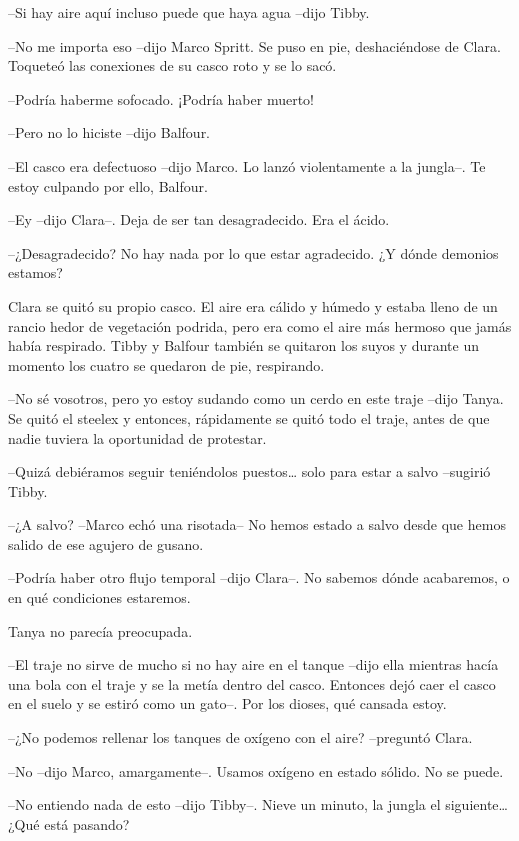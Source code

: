 {--Si hay aire aquí incluso puede que haya agua --dijo Tibby.}

{--No me importa eso --dijo Marco Spritt. Se puso en pie, deshaciéndose
de Clara. Toqueteó las conexiones de su casco roto y se lo sacó.}

{--Podría haberme sofocado. ¡Podría haber muerto!}

{--Pero no lo hiciste --dijo Balfour.}

{--El casco era defectuoso --dijo Marco. Lo lanzó violentamente a la
jungla--. Te estoy culpando por ello, Balfour.}

{--Ey --dijo Clara--. Deja de ser tan desagradecido. Era el ácido.}

{--¿Desagradecido? No hay nada por lo que estar agradecido. ¿Y dónde
demonios estamos?}

{Clara se quitó su propio casco. El aire era cálido y húmedo y estaba
 lleno de un rancio hedor de vegetación podrida, pero era como el aire
 más hermoso que jamás había respirado. Tibby y Balfour también se
 quitaron los suyos y durante un momento los cuatro se quedaron de pie,
respirando.}

{--No sé vosotros, pero yo estoy sudando como un cerdo en este traje
 --dijo Tanya. Se quitó el steelex y entonces, rápidamente se quitó todo
el traje, antes de que nadie tuviera la oportunidad de protestar.}

{--Quizá debiéramos seguir teniéndolos puestos\ldots{} solo para estar a
salvo --sugirió Tibby.}

{--¿A salvo? --Marco echó una risotada-- No hemos estado a salvo desde
que hemos salido de ese agujero de gusano.}

{--Podría haber otro flujo temporal --dijo Clara--. No sabemos dónde
acabaremos, o en qué condiciones estaremos.}

{Tanya no parecía preocupada.}

{--El traje no sirve de mucho si no hay aire en el tanque --dijo ella
 mientras hacía una bola con el traje y se la metía dentro del casco.
 Entonces dejó caer el casco en el suelo y se estiró como un gato--. Por
los dioses, qué cansada estoy.}

{--¿No podemos rellenar los tanques de oxígeno con el aire? --preguntó
Clara.}

{--No --dijo Marco, amargamente--. Usamos oxígeno en estado sólido. No se
puede.}

{--No entiendo nada de esto --dijo Tibby--. Nieve un minuto, la jungla el
 siguiente\ldots{} ¿Qué está pasando?}

